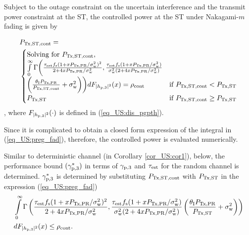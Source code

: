 \begin{lemma} \label{lm_US:lm6}
\normalfont
Subject to the outage constraint on the uncertain interference and the transmit power constraint at the ST, the controlled power at the ST under Nakagami-$m$ fading is given by %

\begin{align}
&P_{\text{Tx,ST,cont}} = \nonumber \\ 
& \begin{cases} 
\text{Solving for $P_{\text{Tx,ST,cont}}$, } \\ \int\limits_{0}^{\infty} \Gamma\bigg(\frac{\tau_{\text{est}} f_{\text{s}} (1 + x P_{\text{Tx,PR}}/\sigma^2_{\text{w}})^2}{2 + 4 x P_{\text{Tx,PR}}/\sigma^2_{\text{w}}}, \frac{\tau_{\text{est}} f_{\text{s}} (1 + x P_{\text{Tx,PR}}/\sigma^2_{\text{w}})}{\sigma^2_{\text{w}} (2 + 4 x P_{\text{Tx,PR}}/\sigma^2_{\text{w}})} \\ \bigg(\frac{\theta_{\text{I}}P_{\text{Tx,PR}}}{P_{\text{Tx,ST,cont}}}  +  \sigma^2_{\text{w}} \bigg)\bigg) d F_{|h_{\text{p,3}}|^2}(x) = \rho_{\text{cont}} & \mbox{if } P_{\text{Tx,ST,cont}} < P_{\text{Tx,ST}} \\
P_{\text{Tx,ST}} & \mbox{if } P_{\text{Tx,ST,cont}} \ge P_{\text{Tx,ST}}
\end{cases}
\label{eq_US:preg_fad} 
\end{align}
, where %
$F_{|h_{\text{p,3}}|^2}(\cdot)$ is defined in (\ref{eq_US:dis_pgpth}). 
\end{lemma} 
\begin{IEEEproof}
Since it is complicated to obtain a closed form expression of the integral in (\ref{eq_US:preg_fad}), therefore, the controlled power is evaluated numerically.  
\end{IEEEproof}
Similar to deterministic channel (in Corollary \ref{cor_US:cor1}), below, the performance bound $({\gamma}_{\text{p,3}}^*)$ in terms of ${\gamma}_{\text{p,3}}$ and $\tau_{\text{est}}$ for the random channel is determined.
 ${\gamma}_{\text{p,3}}^*$ is determined by substituting $P_{\text{Tx,ST,cont}}$ with $P_{\text{Tx,ST}}$ in the expression (\ref{eq_US:preg_fad}) 
\begin{align}
&\int\limits_{0}^{\infty} \Gamma\left( \frac{\tau_{\text{est}} f_{\text{s}} (1 + x P_{\text{Tx,PR}}/\sigma^2_{\text{w}})^2}{2 + 4 x P_{\text{Tx,PR}}/\sigma^2_{\text{w}}}, \frac{\tau_{\text{est}} f_{\text{s}} (1 + x P_{\text{Tx,PR}}/\sigma^2_{\text{w}})}{\sigma^2_{\text{w}} (2 + 4 x P_{\text{Tx,PR}}/\sigma^2_{\text{w}})}  \left(\frac{\theta_{\text{I}}P_{\text{Tx,PR}}}{P_{\text{Tx,ST}}} + \sigma^2_{\text{w}} \right)\right) \nonumber \\ & d F_{|h_{\text{p,3}}|^2}(x) \le \rho_{\text{cont}}. \label{eq_US:or_fad}
\end{align}
